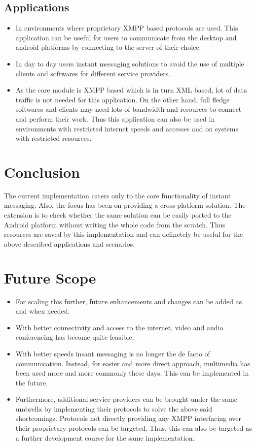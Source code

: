 \documentclass{SureshLimkar}
\begin{document}
\subsection{Applications}
\begin{itemize}
 \item In environments where proprietary XMPP based protocols are used. This application can be useful for users to communicate from the desktop and android platforms by connecting to the server of their choice.
 \item In day to day users instant messaging solutions to avoid the use of multiple clients and softwares for different service providers. 
 \item As the core module is XMPP based which is in turn XML based, lot of data traffic is not needed for this application. On the other hand, full fledge softwares and clients may need lots of bandwidth and resources to connect and perform their work. Thus this application can also be used in environments with restricted internet speeds and accesses and on systems with restricted resources.
\end{itemize}

\section{Conclusion}
\hspace{0.5 in}The current implementation caters only to the core functionality of instant messaging. Also, the focus has been on providing a cross platform solution. The extension is to check whether the same solution can be easily ported to the Android platform without writing the whole code from the scratch. Thus resources are saved by this implementation and can definetely be useful for the above described applications and scenarios.

\section{Future Scope}
\begin{itemize}
 \item For scaling this further, future enhancements and changes can be added as and when needed.
\item With better connectivity and access to the internet, video and audio conferencing has become quite feasible. 
\item With better speeds insant messaging is no longer the de facto of communication. Instead, for easier and more direct approach, multimedia has been used more and more commonly these days. This can be implemented in the future. 
\item Furthermore, additional service providers can be brought under the same umbrella by implementing their protocols  to solve the above said shortcomings. Protocols not directly providing any XMPP interfacing over their proprietary protocols can be targeted. Thus, this can also   be targeted as a further development course for the same implementation.
\end{itemize}
\end{document}
